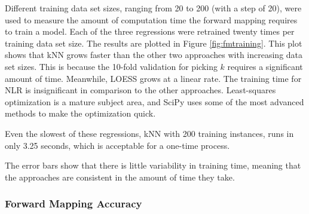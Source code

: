 Different training data set sizes, ranging from 20 to 200 (with a step of 20), were used to measure the amount of computation time the forward mapping requires to train a model.
Each of the three regressions were retrained twenty times per training data set size.
The results are plotted in Figure \ref{fig:fmtraining}.
This plot shows that kNN grows faster than the other two approaches with increasing data set sizes.
This is because the 10-fold validation for picking $k$ requires a significant amount of time.
Meanwhile, LOESS grows at a linear rate.
The training time for NLR is insignificant in comparison to the other approaches.
Least-squares optimization is a mature subject area, and SciPy uses some of the most advanced methods to make the optimization quick.

Even the slowest of these regressions, kNN with 200 training instances, runs in only 3.25 seconds, which is acceptable for a one-time process.


The error bars show that there is little variability in training time, meaning that the approaches are consistent in the amount of time they take.


\subsubsection{Forward Mapping Accuracy}

